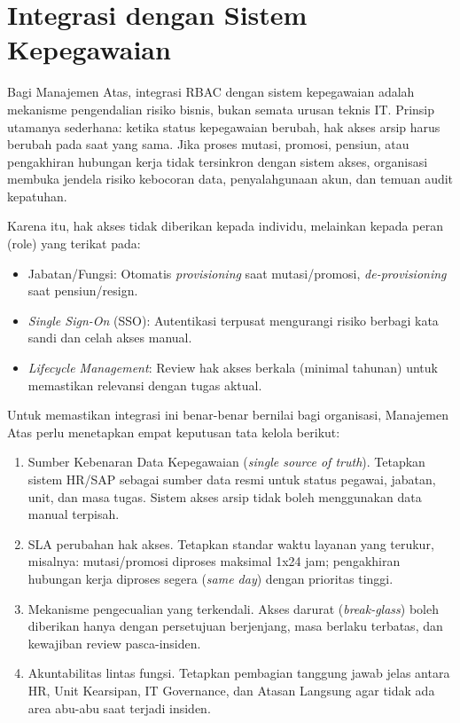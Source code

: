\documentclass[12pt,a4paper]{report}
\begin{document}

\section{Integrasi dengan Sistem Kepegawaian}
Bagi Manajemen Atas, integrasi RBAC dengan sistem kepegawaian adalah mekanisme pengendalian risiko bisnis, bukan semata urusan teknis IT. Prinsip utamanya sederhana: ketika status kepegawaian berubah, hak akses arsip harus berubah pada saat yang sama. Jika proses mutasi, promosi, pensiun, atau pengakhiran hubungan kerja tidak tersinkron dengan sistem akses, organisasi membuka jendela risiko kebocoran data, penyalahgunaan akun, dan temuan audit kepatuhan.

Karena itu, hak akses tidak diberikan kepada individu, melainkan kepada peran (role) yang terikat pada:
\begin{itemize}[leftmargin=*]
    \item Jabatan/Fungsi: Otomatis \textit{provisioning} saat mutasi/promosi, \textit{de-provisioning} saat pensiun/resign.
    \item \textit{Single Sign-On} (SSO): Autentikasi terpusat mengurangi risiko berbagi kata sandi dan celah akses manual.
    \item \textit{Lifecycle Management}: Review hak akses berkala (minimal tahunan) untuk memastikan relevansi dengan tugas aktual.
\end{itemize}

Untuk memastikan integrasi ini benar-benar bernilai bagi organisasi, Manajemen Atas perlu menetapkan empat keputusan tata kelola berikut:
\begin{enumerate}[leftmargin=*]
  \item Sumber Kebenaran Data Kepegawaian (\textit{single source of truth}). Tetapkan sistem HR/SAP sebagai sumber data resmi untuk status pegawai, jabatan, unit, dan masa tugas. Sistem akses arsip tidak boleh menggunakan data manual terpisah.
  \item SLA perubahan hak akses. Tetapkan standar waktu layanan yang terukur, misalnya: mutasi/promosi diproses maksimal 1x24 jam; pengakhiran hubungan kerja diproses segera (\textit{same day}) dengan prioritas tinggi.
  \item Mekanisme pengecualian yang terkendali. Akses darurat (\textit{break-glass}) boleh diberikan hanya dengan persetujuan berjenjang, masa berlaku terbatas, dan kewajiban review pasca-insiden.
  \item Akuntabilitas lintas fungsi. Tetapkan pembagian tanggung jawab jelas antara HR, Unit Kearsipan, IT Governance, dan Atasan Langsung agar tidak ada area abu-abu saat terjadi insiden.
\end{enumerate}
\end{document}
